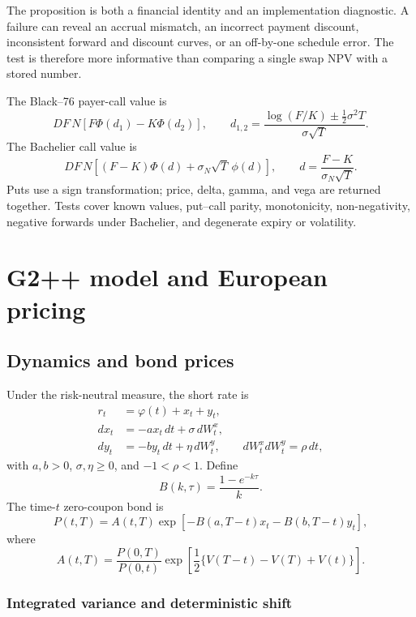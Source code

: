 \documentclass[11pt]{article}
\numberwithin{equation}{section}
\theoremstyle{definition}
\theoremstyle{remark}
\begin{document}
The proposition is both a financial identity and an implementation diagnostic.
A failure can reveal an accrual mismatch, an incorrect payment discount,
inconsistent forward and discount curves, or an off-by-one schedule error. The
test is therefore more informative than comparing a single swap NPV with a
stored number.

The Black--76 payer-call value is
\begin{equation}
  DF\,N\left[F\Phi(d_1)-K\Phi(d_2)\right],\qquad
  d_{1,2}=\frac{\log(F/K)\pm\frac12\sigma^2T}{\sigma\sqrt T}.
\end{equation}
The Bachelier call value is
\begin{equation}
  DF\,N\left[(F-K)\Phi(d)+\sigma_N\sqrt T\,\phi(d)\right],\qquad
  d=\frac{F-K}{\sigma_N\sqrt T}.
\end{equation}
Puts use a sign transformation; price, delta, gamma, and vega are returned
together. Tests cover known values, put--call parity, monotonicity,
non-negativity, negative forwards under Bachelier, and degenerate expiry or
volatility.

\section{G2++ model and European pricing}
\label{sec:g2}

\subsection{Dynamics and bond prices}

Under the risk-neutral measure, the short rate is
\begin{align}
  r_t &= \varphi(t)+x_t+y_t,\\
  dx_t &= -a x_t\,dt+\sigma\,dW_t^x,\\
  dy_t &= -b y_t\,dt+\eta\,dW_t^y,\qquad
  dW_t^x dW_t^y=\rho\,dt,
\end{align}
with $a,b>0$, $\sigma,\eta\geq0$, and $-1<\rho<1$. Define
\begin{equation}
  B(k,\tau)=\frac{1-e^{-k\tau}}{k}.
\end{equation}
The time-$t$ zero-coupon bond is
\begin{equation}
  P(t,T)=A(t,T)
  \exp[-B(a,T-t)x_t-B(b,T-t)y_t],
\end{equation}
where
\begin{equation}
  A(t,T)=\frac{P(0,T)}{P(0,t)}
  \exp\left[\frac12\{V(T-t)-V(T)+V(t)\}\right].
\end{equation}
\subsubsection{Integrated variance and deterministic shift}
\end{document}
